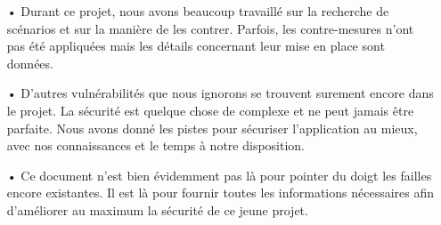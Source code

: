 \begin{itemize}
\item[•] Durant ce projet, nous avons beaucoup travaillé sur la recherche de scénarios et sur la manière de les contrer. Parfois, les contre-mesures n'ont pas été appliquées mais les détails concernant leur mise en place sont données.
\item[•] D'autres vulnérabilités que nous ignorons se trouvent surement encore dans le projet. La sécurité est quelque chose de complexe et ne peut jamais être parfaite. Nous avons donné les pistes pour sécuriser l'application au mieux, avec nos connaissances et le temps à notre disposition.
\item[•] Ce document n'est bien évidemment pas là pour pointer du doigt les failles encore existantes. Il est là pour fournir toutes les informations nécessaires afin d'améliorer au maximum la sécurité de ce jeune projet.
\end{itemize}
